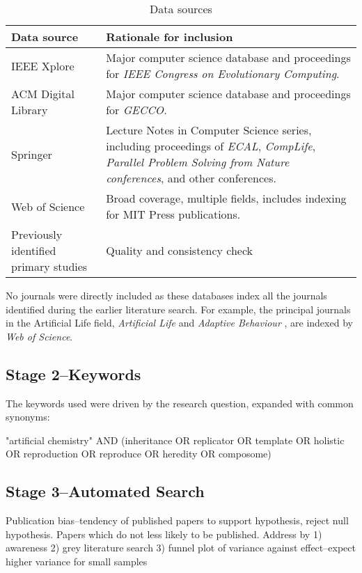 \begin{table}
\footnotesize
\begin{center}
\begin{tabular}{@{}p{4cm}p{9cm}@{}}
\toprule
Data source & Rationale for inclusion\\
\midrule
IEEE Xplore & Major computer science database and proceedings for \textit{IEEE Congress on Evolutionary Computing}.\\
ACM Digital Library & Major computer science database and proceedings for \textit{GECCO}.\\
Springer & Lecture Notes in Computer Science series, including proceedings of \textit{ECAL}, \textit{CompLife}, \textit{Parallel Problem Solving from Nature conferences}, and other conferences.\\
Web of Science & Broad coverage, multiple fields, includes indexing for MIT Press publications.\\
Previously identified primary studies & Quality and consistency check\\
\bottomrule
\end{tabular}
\end{center}
\caption{Data sources}
\end{table}

No journals were directly included as these databases index all the journals identified during the earlier literature search. For example, the principal journals in the Artificial Life field, \emph{Artificial Life} and \emph{Adaptive Behaviour} \parencite{Aicardi2010}, are indexed by \textit{Web of Science}.

\subsection{Stage 2--Keywords}

The keywords used were driven by the research question, expanded with common synonyms:

"artificial chemistry" AND (inheritance OR replicator OR template OR holistic OR reproduction OR reproduce OR heredity OR composome)

\subsection{Stage 3--Automated Search}

Publication bias--tendency of published papers to support hypothesis, reject null hypothesis. Papers which do not less likely to be published. Address by 1) awareness 2) grey literature search 3) funnel plot of variance against effect--expect higher variance for small samples

